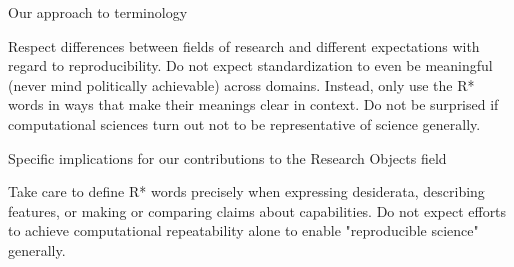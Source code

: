 		Our approach to terminology

			Respect differences between fields of research and different expectations with regard to reproducibility.
			Do not expect standardization to even be meaningful (never mind politically achievable) across domains.
			Instead, only use the R* words in ways that make their meanings clear in context.
			Do not be surprised if computational sciences turn out not to be representative of science generally.

		Specific implications for our contributions to the Research Objects field

			Take care to define R* words precisely when expressing desiderata, describing features, or making or comparing claims about capabilities.
			Do not expect efforts to achieve computational repeatability alone to enable "reproducible science" generally.


